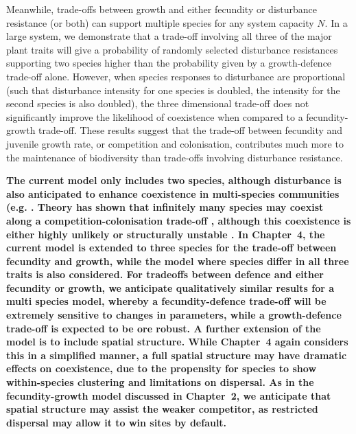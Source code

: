 \documentclass[preprint,10pt,reqno]{report}
\begin{document}
Meanwhile, trade-offs between growth and either fecundity or disturbance resistance (or both) can support multiple species for any system capacity $N$. In a large system, we demonstrate that a trade-off involving all three of the major plant traits will give a probability of randomly selected disturbance resistances supporting two species higher than the probability given by a growth-defence trade-off alone. However, when species responses to disturbance are proportional (such that disturbance intensity for one species is doubled, the intensity for the second species is also doubled), the three dimensional trade-off does not significantly improve the likelihood of coexistence when compared to a fecundity-growth trade-off. These results suggest that the trade-off between fecundity and juvenile growth rate, or competition and colonisation, contributes much more to the maintenance of biodiversity than trade-offs involving disturbance resistance.  

\textbf{The current model only includes two species, although disturbance is also anticipated to enhance coexistence in multi-species communities (e.g. \cite{loehle2000strategy,roxburgh2004intermediate}. Theory has shown that infinitely many species may coexist along a competition-colonisation trade-off \cite{tilman1994competition,adler2000space}, although this coexistence is either highly unlikely or structurally unstable \cite{nattrass2012quantifying, gyllenberg2005impossibility}. In Chapter~4, the current model is extended to three species for the trade-off between fecundity and growth, while the model where species differ in all three traits is also considered. For tradeoffs between defence and either fecundity or growth, we anticipate qualitatively similar results for a multi species model, whereby a fecundity-defence trade-off will be extremely sensitive to changes in parameters, while a growth-defence trade-off is expected to be ore robust. A further extension of the model is to include spatial structure. While Chapter~4 again considers this in a simplified manner, a full spatial structure may have dramatic effects on coexistence, due to the propensity for species to show within-species clustering \cite{condit2000spatial,murrell2001uniting} and limitations on dispersal. As in the fecundity-growth model discussed in Chapter~2, we anticipate that spatial structure may assist the weaker competitor, as restricted dispersal may allow it to win sites by default.}
\end{document}
